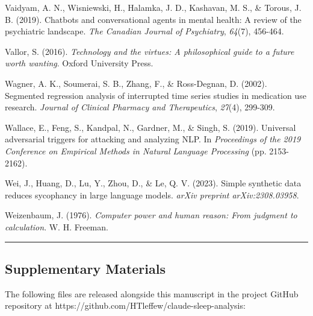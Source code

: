 \documentclass[11pt]{article}
\begin{document}
Vaidyam, A. N., Wisniewski, H., Halamka, J. D., Kashavan, M. S., \& Torous, J. B. (2019). Chatbots and conversational agents in mental health: A review of the psychiatric landscape. \emph{The Canadian Journal of Psychiatry}, \emph{64}(7), 456-464.

Vallor, S. (2016). \emph{Technology and the virtues: A philosophical guide to a future worth wanting}. Oxford University Press.

Wagner, A. K., Soumerai, S. B., Zhang, F., \& Ross-Degnan, D. (2002). Segmented regression analysis of interrupted time series studies in medication use research. \emph{Journal of Clinical Pharmacy and Therapeutics}, \emph{27}(4), 299-309.

Wallace, E., Feng, S., Kandpal, N., Gardner, M., \& Singh, S. (2019). Universal adversarial triggers for attacking and analyzing NLP. In \emph{Proceedings of the 2019 Conference on Empirical Methods in Natural Language Processing} (pp. 2153-2162).

Wei, J., Huang, D., Lu, Y., Zhou, D., \& Le, Q. V. (2023). Simple synthetic data reduces sycophancy in large language models. \emph{arXiv preprint arXiv:2308.03958}.

Weizenbaum, J. (1976). \emph{Computer power and human reason: From judgment to calculation}. W. H. Freeman.

\bigskip\hrule\bigskip

\subsection{Supplementary Materials}

The following files are released alongside this manuscript in the project GitHub repository at https://github.com/HTleffew/claude-sleep-analysis:
\end{document}
